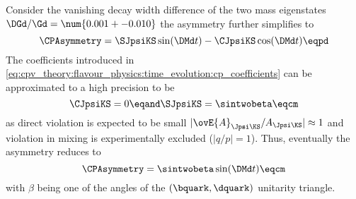 Consider the vanishing decay width difference of the two mass eigenstates
$\DGd/\Gd = \num{0.001 +- 0.010}$ \cite{Amhis:2014hma} the \CP asymmetry further
simplifies to
%
\begin{equation}
  \CPAsymmetry = \SJpsiKS\sin(\DMd t) - \CJpsiKS\cos(\DMd t) \eqpd
\end{equation}
%
The \CP coefficients introduced in
\cref{eq:cpv_theory:flavour_physics:time_evolution:cp_coefficients} can be
approximated to a high precision to be
%
\begin{equation}
  \CJpsiKS = 0 \eqand 
  \SJpsiKS = \sintwobeta \eqcm
\end{equation}
%
as direct \CP violation is expected to be small
$\vert\ovE{A}_{\Jpsi\KS}/A_{\Jpsi\KS}\vert\approx 1$ and \CP violation in mixing
is experimentally excluded ($\vert q/p \vert = 1$). Thus, eventually the \CP
asymmetry reduces to
%
\begin{equation}
  \CPAsymmetry = \sintwobeta\sin(\DMd t) \eqcm
\end{equation}
%
with $\beta$ being one of the angles of the ${(\bquark,\dquark)}$ unitarity
triangle.

